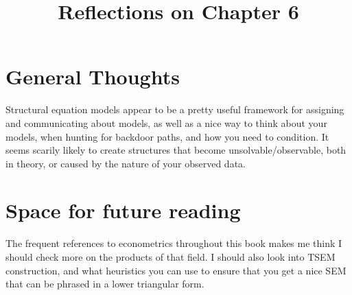\documentclass[10pt, english]{article}
\begin{document}
\title{Reflections on Chapter 6}
\date{}
\author{}

\maketitle


\section*{General Thoughts}
Structural equation models appear to be a pretty useful framework for assigning and communicating about models, as well as a nice way to think about your models, when 
hunting for backdoor paths, and how you need to condition. It seems scarily likely to create structures that become unsolvable/observable, both in theory, or caused by the nature of your observed data.


\section*{Space for future reading}
The frequent references to econometrics throughout this book makes me think I should check more on the products of that field. I should also look into TSEM construction, and what heuristics you can use to ensure that you
get a nice SEM that can be phrased in a lower triangular form.
\end{document}
